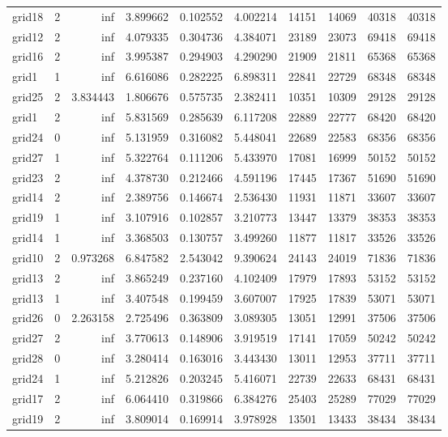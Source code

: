 \begin{longtable}{|l|r|r|r|r|r|r|r|r|r|}
grid18 & 2 & inf & 3.899662 & 0.102552 & 4.002214 & 14151 & 14069 & 40318 & 40318 \\
grid12 & 2 & inf & 4.079335 & 0.304736 & 4.384071 & 23189 & 23073 & 69418 & 69418 \\
grid16 & 2 & inf & 3.995387 & 0.294903 & 4.290290 & 21909 & 21811 & 65368 & 65368 \\
grid1 & 1 & inf & 6.616086 & 0.282225 & 6.898311 & 22841 & 22729 & 68348 & 68348 \\
grid25 & 2 & 3.834443 & 1.806676 & 0.575735 & 2.382411 & 10351 & 10309 & 29128 & 29128 \\
grid1 & 2 & inf & 5.831569 & 0.285639 & 6.117208 & 22889 & 22777 & 68420 & 68420 \\
grid24 & 0 & inf & 5.131959 & 0.316082 & 5.448041 & 22689 & 22583 & 68356 & 68356 \\
grid27 & 1 & inf & 5.322764 & 0.111206 & 5.433970 & 17081 & 16999 & 50152 & 50152 \\
grid23 & 2 & inf & 4.378730 & 0.212466 & 4.591196 & 17445 & 17367 & 51690 & 51690 \\
grid14 & 2 & inf & 2.389756 & 0.146674 & 2.536430 & 11931 & 11871 & 33607 & 33607 \\
grid19 & 1 & inf & 3.107916 & 0.102857 & 3.210773 & 13447 & 13379 & 38353 & 38353 \\
grid14 & 1 & inf & 3.368503 & 0.130757 & 3.499260 & 11877 & 11817 & 33526 & 33526 \\
grid10 & 2 & 0.973268 & 6.847582 & 2.543042 & 9.390624 & 24143 & 24019 & 71836 & 71836 \\
grid13 & 2 & inf & 3.865249 & 0.237160 & 4.102409 & 17979 & 17893 & 53152 & 53152 \\
grid13 & 1 & inf & 3.407548 & 0.199459 & 3.607007 & 17925 & 17839 & 53071 & 53071 \\
grid26 & 0 & 2.263158 & 2.725496 & 0.363809 & 3.089305 & 13051 & 12991 & 37506 & 37506 \\
grid27 & 2 & inf & 3.770613 & 0.148906 & 3.919519 & 17141 & 17059 & 50242 & 50242 \\
grid28 & 0 & inf & 3.280414 & 0.163016 & 3.443430 & 13011 & 12953 & 37711 & 37711 \\
grid24 & 1 & inf & 5.212826 & 0.203245 & 5.416071 & 22739 & 22633 & 68431 & 68431 \\
grid17 & 2 & inf & 6.064410 & 0.319866 & 6.384276 & 25403 & 25289 & 77029 & 77029 \\
grid19 & 2 & inf & 3.809014 & 0.169914 & 3.978928 & 13501 & 13433 & 38434 & 38434 \\

\end{longtable}
